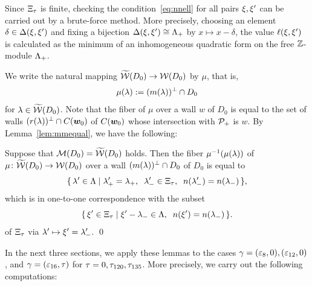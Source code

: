 \documentclass{amsart} %
\begin{document}
%
\begin{remark}\label{rem:MMMtilwalls}
Since $\Xi_{\tau}$ is finite,
checking the condition~\eqref{eq:nnell} for all pairs $\xi, \xi^{\prime}$
 can be carried out by a brute-force method.
 More precisely, 
choosing an element  $\delta\in \Delta(\xi, \xi^{\prime})$
and fixing a bijection $\Delta(\xi, \xi^{\prime})\cong \Lambda_{+}$ by $x\mapsto x-\delta$,
the value  $\ell(\xi, \xi^{\prime})$ is calculated as the minimum of
an inhomogeneous quadratic form on the free $\mathord{\mathbb{Z}}$-module $\Lambda_{+}$.
\end{remark}
%
We write the natural mapping
$\widetilde{\mathord{\mathcal{W}}}(D_0)\to \mathord{\mathcal{W}}(D_0)$
by $\mu$, that is, 
\[
\mu(\lambda):=(m(\lambda))^{\perp}\cap D_0
\]
for $\lambda\in \widetilde{\mathord{\mathcal{W}}}(D_0)$.
Note that the fiber of $\mu$ over a wall $w$
of $D_0$ is equal to the set of walls $(r(\lambda))^{\perp}\cap \mathord{C}(\boldsymbol{w}_0)$
of $\mathord{C}(\boldsymbol{w}_0)$ whose intersection with $\mathord{\mathcal{P}}_{+}$ is $w$.
By Lemma~\ref{lem:mmequal}, we have the following:
%
\begin{lemma}\label{lem:wallfiber}
Suppose that $\mathord{\mathcal{M}}(D_0)=\widetilde{\mathord{\mathcal{W}}} (D_0)$ holds.
Then the fiber $\mu^{-1}(\mu(\lambda))$ 
of 
$\mu\colon \widetilde{\mathord{\mathcal{W}}}(D_0)\to \mathord{\mathcal{W}}(D_0)$
over a wall $(m(\lambda))^{\perp}\cap D_0$ of $D_0$
is equal to
\[
\set{\lambda\sprime\in \Leech}%
{\lambdaplus\sprime=\lambdaplus, \;\; \lambdaminus\sprime\in \Xitau, \;\; n(\lambdaminus\sprime)=n(\lambdaminus)},
\]
which is in one-to-one correspondence with the subset 
\[
\{\,{\xi^{\prime}\in \Xi_{\tau}}\mid {\xi^{\prime}-{\lambda}_{-}\in \Lambda, \;\; n(\xi^{\prime})=n({\lambda}_{-})} \,\}.
\]
of $\Xi_{\tau}$ via $\lambda^{\prime} \mapsto \xi^{\prime}={\lambda}_{-}^{\prime}$.
\qed
\end{lemma}
%
In the next three sections, we apply these lemmas to the cases $\gamma=(\varepsilon_8, 0), (\varepsilon_{12}, 0)$,
and $\gamma=(\varepsilon_{16}, \tau)$ for $\tau=0,\tau_{120},\tau_{135}$.
More precisely,
we carry out the following computations:
%
\end{document}
